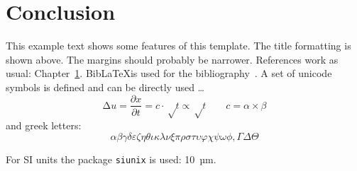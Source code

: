 \chapter{Conclusion}
\label{cha:conclusion}

This example text shows some features of this template.
The title formatting is shown above. The margins should probably be narrower.
References work as usual: Chapter~\ref{cha:conclusion}.
Bib\LaTeX is used for the bibliography~\cite{PAS-LUM-13-001,higgscms2012}.
A set of unicode symbols is defined and can be directly used …
\[
	∆u = \frac{∂x}{∂t} = c · √t ∝ √t \qquad c = α × β
\]
and greek letters:
\[
	αβγδεζηθικλ νξπρστυφχψωϕ, ΓΔΘ
\]

For SI units the package \texttt{siunix} is used: \SI{10}{µm}.

